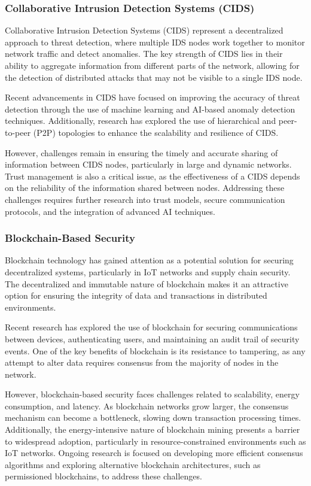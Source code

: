 \subsubsection{Collaborative Intrusion Detection Systems (CIDS)}

Collaborative Intrusion Detection Systems (CIDS) represent a decentralized approach to threat detection, where multiple IDS nodes work together to monitor network traffic and detect anomalies. The key strength of CIDS lies in their ability to aggregate information from different parts of the network, allowing for the detection of distributed attacks that may not be visible to a single IDS node.

Recent advancements in CIDS have focused on improving the accuracy of threat detection through the use of machine learning and AI-based anomaly detection techniques. Additionally, research has explored the use of hierarchical and peer-to-peer (P2P) topologies to enhance the scalability and resilience of CIDS.

However, challenges remain in ensuring the timely and accurate sharing of information between CIDS nodes, particularly in large and dynamic networks. Trust management is also a critical issue, as the effectiveness of a CIDS depends on the reliability of the information shared between nodes. Addressing these challenges requires further research into trust models, secure communication protocols, and the integration of advanced AI techniques.

\subsubsection{Blockchain-Based Security}

Blockchain technology has gained attention as a potential solution for securing decentralized systems, particularly in IoT networks and supply chain security. The decentralized and immutable nature of blockchain makes it an attractive option for ensuring the integrity of data and transactions in distributed environments.

Recent research has explored the use of blockchain for securing communications between devices, authenticating users, and maintaining an audit trail of security events. One of the key benefits of blockchain is its resistance to tampering, as any attempt to alter data requires consensus from the majority of nodes in the network.

However, blockchain-based security faces challenges related to scalability, energy consumption, and latency. As blockchain networks grow larger, the consensus mechanism can become a bottleneck, slowing down transaction processing times. Additionally, the energy-intensive nature of blockchain mining presents a barrier to widespread adoption, particularly in resource-constrained environments such as IoT networks. Ongoing research is focused on developing more efficient consensus algorithms and exploring alternative blockchain architectures, such as permissioned blockchains, to address these challenges.

